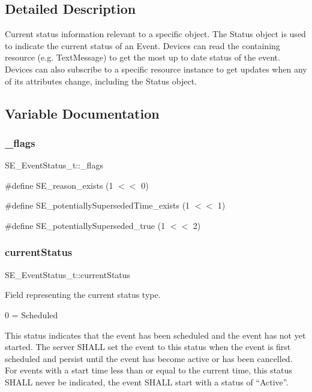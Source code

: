 \subsection{Detailed Description}
Current status information relevant to a specific object. The Status object is used to indicate the current status of an Event. Devices can read the containing resource (e.\+g. Text\+Message) to get the most up to date status of the event. Devices can also subscribe to a specific resource instance to get updates when any of its attributes change, including the Status object. 

\subsection{Variable Documentation}
\mbox{\label{group__EventStatus_ga22ffd743b9bee41ded4925788c8bd778}} 
\subsubsection{\texorpdfstring{\+\_\+flags}{\_flags}}
{\footnotesize\ttfamily S\+E\+\_\+\+Event\+Status\+\_\+t\+::\+\_\+flags}

\#define S\+E\+\_\+reason\+\_\+exists (1 $<$$<$ 0)

\#define S\+E\+\_\+potentially\+Superseded\+Time\+\_\+exists (1 $<$$<$ 1)

\#define S\+E\+\_\+potentially\+Superseded\+\_\+true (1 $<$$<$ 2) \mbox{\label{group__EventStatus_ga59fc1cc6e5c19bf792c0b84e7e37a4e7}} 
\subsubsection{\texorpdfstring{current\+Status}{currentStatus}}
{\footnotesize\ttfamily S\+E\+\_\+\+Event\+Status\+\_\+t\+::current\+Status}

Field representing the current status type.

0 = Scheduled

This status indicates that the event has been scheduled and the event has not yet started. The server S\+H\+A\+LL set the event to this status when the event is first scheduled and persist until the event has become active or has been cancelled. For events with a start time less than or equal to the current time, this status S\+H\+A\+LL never be indicated, the event S\+H\+A\+LL start with a status of “\+Active”.


